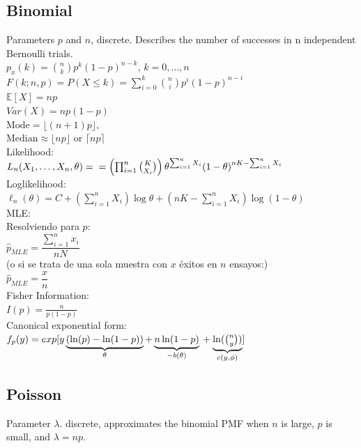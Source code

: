 \subsection*{Binomial}
Parameters $p$ and $n$, discrete. Describes the number of successes
in n independent Bernoulli trials.\\

$p_x(k)= {n\choose k}{p}^{k} \left( 1-p \right) ^{n-k}$, $k=0,\ldots, n$\\
$F(k; n, p) = P(X \leq k) = \sum_{i=0}^{k} \binom{n}{i} p^{i} (1 - p)^{n - i}$\\
$\mathbb{E}[X]=np$\\
$Var(X)= np(1-p)$ \\
$\text{Mode} = \lfloor (n+1)p \rfloor,\quad$ \\
$\text{Median} \approx \lfloor np \rfloor \text{ or } \lceil np \rceil$\\
Likelihood:\\
$\displaystyle  L_ n(X_1, \ldots , X_ n, \theta ) =\\
= \left( \prod _{i = 1}^ n \binom {K}{X_ i} \right) \theta ^{\sum _{i = 1}^ n X_ i} (1 - \theta )^{nK - \sum _{i = 1}^ n X_ i }$\\
Loglikelihood:\\
$\ell_n (\theta) = C + \left( \sum _{i = 1}^ n X_ i \right) \log \theta + \left( nK - \sum _{i = 1}^ n X_ i \right) \log (1 - \theta )$\\
MLE:\\
Resolviendo para $p$:\\
$\displaystyle \hat{p}_{MLE} = \dfrac{\sum_{i=1}^n x_i}{nN}$\\
(o si se trata de una sola muestra con $x$ éxitos en $n$ ensayos:)\\
$\displaystyle \hat{p}_{MLE} = \dfrac{x}{n}$\\[6pt]
Fisher Information:\\
$I(p) = \frac{n}{p(1-p)}$\\
Canonical exponential form:\\
$f_ p(y) =\\  
exp [y \underbrace{(\ln (p)-\ln (1-p))}_{\theta } + \underbrace{n\ln (1-p)}_{-b(\theta )} \\
+\underbrace{\ln(\binom {n}{y})}_{c(y,\phi )} ]$

\subsection*{Poisson}
Parameter $\lambda$. discrete, approximates the binomial PMF when $n$ is large, $p$ is small, and $\lambda = np$.\\

